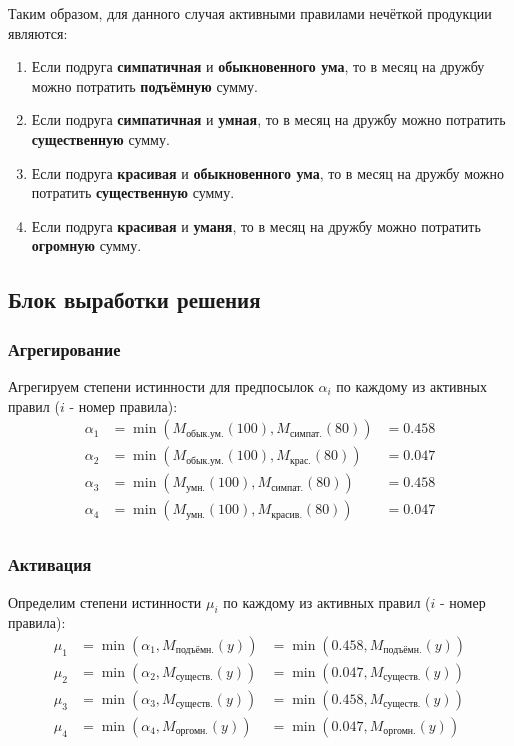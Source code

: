 \documentclass[12pt, a4paper]{article}
\begin{document}
Таким образом, для данного случая активными правилами нечёткой продукции являются:
\begin{enumerate}
\item Если подруга  \textbf{симпатичная} и \textbf{обыкновенного ума}, то в месяц на дружбу можно потратить \textbf{подъёмную} сумму.
\item Если подруга  \textbf{симпатичная} и \textbf{умная}, то в месяц на дружбу можно потратить \textbf{существенную} сумму.
\item Если подруга  \textbf{красивая} и \textbf{обыкновенного ума}, то в месяц на дружбу можно потратить \textbf{существенную} сумму.
\item Если подруга  \textbf{красивая} и \textbf{уманя}, то в месяц на дружбу можно потратить \textbf{огромную} сумму.
\end{enumerate}
\subsection{Блок выработки решения}
\subsubsection{Агрегирование}
Агрегируем степени истинности для предпосылок $\alpha_i$  по каждому из активных правил ($i$ - номер правила):
\begin{equation*}
\begin{aligned}
\alpha_1 &= \min(M_{\text{обык.ум.}}(100), M_{\text{симпат.}}(80)) &= 0.458 \\
\alpha_2 &= \min(M_{\text{обык.ум.}}(100), M_{\text{крас.}}(80)) &= 0.047 \\
\alpha_3 &= \min(M_{\text{умн.}}(100), M_{\text{симпат.}}(80)) &= 0.458 \\
\alpha_4 &= \min(M_{\text{умн.}}(100), M_{\text{красив.}}(80)) &= 0.047 \\
\end{aligned}
\end{equation*}

\subsubsection{Активация}
Определим степени истинности $\mu_i$ по каждому из активных правил ($i$ - номер правила):
\begin{equation*}
\begin{aligned}
\mu_{1} &= \min(\alpha_1, M_{\text{подъёмн.}}(y)) &= \min(0.458, M_{\text{подъёмн.}}(y)) \\
\mu_{2} &= \min(\alpha_2, M_{\text{существ.}}(y)) &= \min(0.047, M_{\text{существ.}}(y)) \\
\mu_{3} &= \min(\alpha_3, M_{\text{существ.}}(y)) &= \min(0.458, M_{\text{существ.}}(y)) \\
\mu_{4} &= \min(\alpha_4, M_{\text{оргомн.}}(y)) &= \min(0.047, M_{\text{оргомн.}}(y)) \\
\end{aligned}
\end{equation*}
\end{document}
